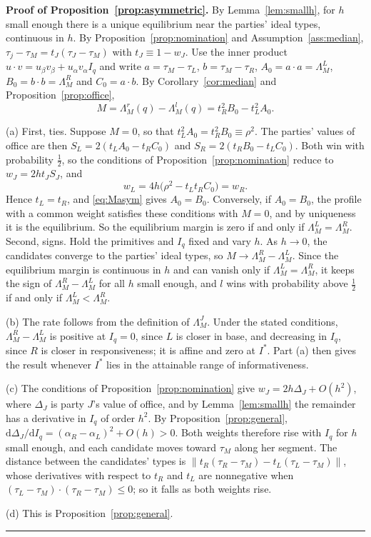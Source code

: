 \documentclass[12pt,letterpaper]{article}
\newenvironment{proof}[1][Proof]{\noindent\textbf{#1.} }{\ \rule{0.5em}{0.5em}}
\begin{document}
\begin{proof}[Proof of Proposition~\ref{prop:asymmetric}]
By Lemma~\ref{lem:smallh}, for $h$ small enough there is a unique equilibrium near the parties' ideal types, continuous in $h$. By Proposition~\ref{prop:nomination} and Assumption~\ref{ass:median}, $\tau_j-\tau_M=t_J(\tau_J-\tau_M)$ with $t_J\equiv1-w_J$. Use the inner product $u\cdot v=u_\beta v_\beta+u_\alpha v_\alpha I_q$ and write $a=\tau_M-\tau_L$, $b=\tau_M-\tau_R$, $A_0=a\cdot a=\Lambda_M^L$, $B_0=b\cdot b=\Lambda_M^R$ and $C_0=a\cdot b$. By Corollary~\ref{cor:median} and Proposition~\ref{prop:office},
\begin{equation}\label{eq:Masym}
M=\Lambda_M^r(q)-\Lambda_M^l(q)=t_R^2B_0-t_L^2A_0.
\end{equation}

(a) First, ties. Suppose $M=0$, so that $t_L^2A_0=t_R^2B_0\equiv\rho^2$. The parties' values of office are then $S_L=2(t_LA_0-t_RC_0)$ and $S_R=2(t_RB_0-t_LC_0)$. Both win with probability $\tfrac12$, so the conditions of Proposition~\ref{prop:nomination} reduce to $w_J=2ht_JS_J$, and
\[
w_L=4h\big(\rho^2-t_Lt_RC_0\big)=w_R .
\]
Hence $t_L=t_R$, and \eqref{eq:Masym} gives $A_0=B_0$. Conversely, if $A_0=B_0$, the profile with a common weight satisfies these conditions with $M=0$, and by uniqueness it is the equilibrium. So the equilibrium margin is zero if and only if $\Lambda_M^L=\Lambda_M^R$. Second, signs. Hold the primitives and $I_q$ fixed and vary $h$. As $h\to0$, the candidates converge to the parties' ideal types, so $M\to\Lambda_M^R-\Lambda_M^L$. Since the equilibrium margin is continuous in $h$ and can vanish only if $\Lambda_M^L=\Lambda_M^R$, it keeps the sign of $\Lambda_M^R-\Lambda_M^L$ for all $h$ small enough, and $l$ wins with probability above $\tfrac12$ if and only if $\Lambda_M^L<\Lambda_M^R$.

(b) The rate follows from the definition of $\Lambda_M^J$. Under the stated conditions, $\Lambda_M^R-\Lambda_M^L$ is positive at $I_q=0$, since $L$ is closer in base, and decreasing in $I_q$, since $R$ is closer in responsiveness; it is affine and zero at $I^*$. Part (a) then gives the result whenever $I^*$ lies in the attainable range of informativeness.

(c) The conditions of Proposition~\ref{prop:nomination} give $w_J=2h\Delta_J+O(h^2)$, where $\Delta_J$ is party $J$'s value of office, and by Lemma~\ref{lem:smallh} the remainder has a derivative in $I_q$ of order $h^2$. By Proposition~\ref{prop:general}, $\mathrm{d}\Delta_J/\mathrm{d}I_q=(\alpha_R-\alpha_L)^2+O(h)>0$. Both weights therefore rise with $I_q$ for $h$ small enough, and each candidate moves toward $\tau_M$ along her segment. The distance between the candidates' types is $\|t_R(\tau_R-\tau_M)-t_L(\tau_L-\tau_M)\|$, whose derivatives with respect to $t_R$ and $t_L$ are nonnegative when $(\tau_L-\tau_M)\cdot(\tau_R-\tau_M)\le0$; so it falls as both weights rise.

(d) This is Proposition~\ref{prop:general}.
\end{proof}
\end{document}
